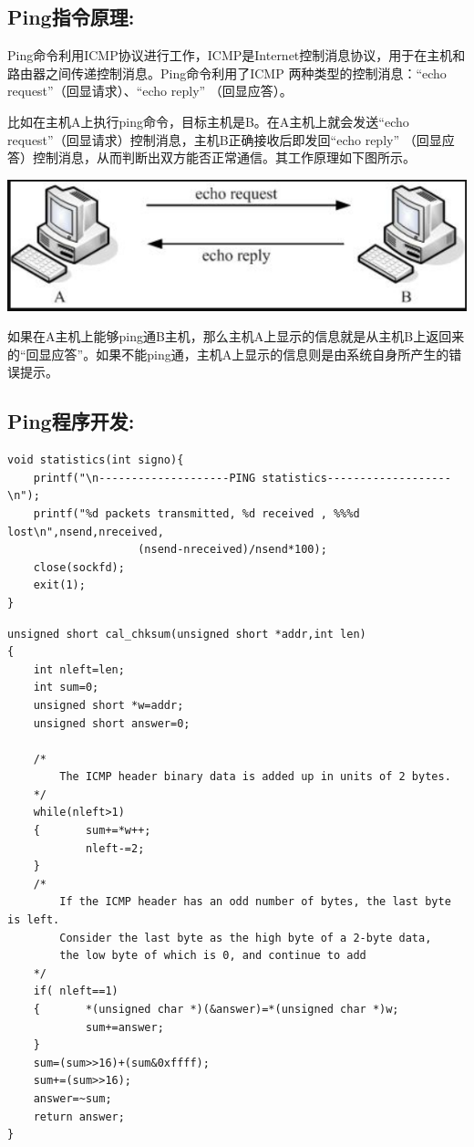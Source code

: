\documentclass[UTF8]{ctexart}
\begin{document}
\subsection{Ping指令原理:}{Ping命令利用ICMP协议进行工作，ICMP是Internet控制消息协议，用于在主机和路由器之间传递控制消息。Ping命令利用了ICMP 两种类型的控制消息：“echo request”（回显请求）、“echo reply” （回显应答）。}
\par{比如在主机A上执行ping命令，目标主机是B。在A主机上就会发送“echo request”（回显请求）控制消息，主机B正确接收后即发回“echo reply” （回显应答）控制消息，从而判断出双方能否正常通信。其工作原理如下图所示。\\}
\par\par\centerline{\includegraphics[scale=0.6]{fig1.png}}
\par\par{如果在A主机上能够ping通B主机，那么主机A上显示的信息就是从主机B上返回来的“回显应答”。如果不能ping通，主机A上显示的信息则是由系统自身所产生的错误提示。}


\subsection{Ping程序开发:}
\par{
\begin{lstlisting}
void statistics(int signo){
    printf("\n--------------------PING statistics-------------------\n");
    printf("%d packets transmitted, %d received , %%%d lost\n",nsend,nreceived,
                    (nsend-nreceived)/nsend*100);
    close(sockfd);
    exit(1);
}
\end{lstlisting}
}

\par{
\begin{lstlisting}
unsigned short cal_chksum(unsigned short *addr,int len)
{
    int nleft=len;
    int sum=0;
    unsigned short *w=addr;
    unsigned short answer=0;

    /*
        The ICMP header binary data is added up in units of 2 bytes.
    */
    while(nleft>1)
    {       sum+=*w++;
            nleft-=2;
    }
    /*
        If the ICMP header has an odd number of bytes, the last byte is left.
        Consider the last byte as the high byte of a 2-byte data,
        the low byte of which is 0, and continue to add
    */
    if( nleft==1)
    {       *(unsigned char *)(&answer)=*(unsigned char *)w;
            sum+=answer;
    }
    sum=(sum>>16)+(sum&0xffff);
    sum+=(sum>>16);
    answer=~sum;
    return answer;
}

\end{lstlisting}
}
\end{document}
